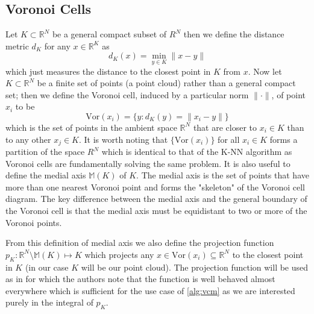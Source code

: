 \documentclass{article}
\begin{document}
\subsection{Voronoi Cells}
Let $K \subset \mathbb{R}^N$ be a general compact subset of $R^N$ then we define the distance metric $d_K$ for any $x \in \mathbb{R}^K$ as
\begin{equation}
    d_K(x) = \min_{y\in K} \|x-y\|
\end{equation}
which just measures the distance to the closest point in $K$ from $x$. Now let $K \subset \mathbb{R}^N$ be a finite set of points (a point cloud) rather than a general compact set; then we define the Voronoi cell, induced by a particular norm $\|\cdot\|$, of point $x_i$ to be 
\begin{equation}
    \text{Vor}(x_i) = \{y: d_K(y) = \|x_i - y\| \}
\end{equation}
which is the set of points in the ambient space $\mathbb{R}^N$ that are closer to $x_i \in K$ than to any other $x_j \in K$. It is worth noting that $\{\text{Vor}(x_i)\}$ for all $x_i \in K$ forms a partition of the space $R^N$ which is identical to that of the K-NN algorithm as Voronoi cells are fundamentally solving the same problem. It is also useful to define the medial axis $\mathbb{M}(K)$ of $K$. The medial axis is the set of points that have more than one nearest Voronoi point and forms the "skeleton" of the Voronoi cell diagram. The key difference between the medial axis and the general boundary of the Voronoi cell is that the medial axis must be equidistant to two or more of the Voronoi points.

From this definition of medial axis we also define the projection function $p_K : \mathbb{R}^N \setminus \mathbb{M}(K) \mapsto K$ which projects any $x \in \text{Vor}(x_i) \subseteq \mathbb{R}^N$ to the closest point in $K$ (in our case $K$ will be our point cloud). The projection function will be used as in \cite{merigotVORONOI2011} for which the authors note that the function is well behaved almost everywhere which is sufficient for the use case of \eqref{alg:vcm} as we are interested purely in the integral of $p_K$.  
\end{document}
